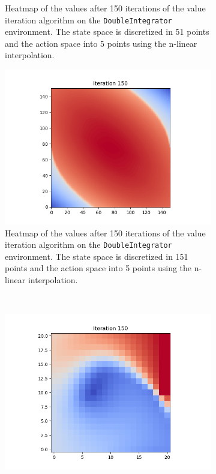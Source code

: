 \documentclass{article}
\begin{document}
\begin{enumerate}[(a)]
\begin{figure}[h!]
\begin{subfigure}{0.3\textwidth}
        \caption{Heatmap of the values after 150 iterations of the value iteration algorithm on the \texttt{DoubleIntegrator} environment. 
                The state space is discretized in 51 points and the action space into 5 points using the n-linear interpolation.}
    \end{subfigure}
    \hspace{0.1 in}
    \begin{subfigure}{0.3\textwidth}
        \centering
        \includegraphics[width=\textwidth]{figures/part_2_b_c.png}
        \caption{Heatmap of the values after 150 iterations of the value iteration algorithm on the \texttt{DoubleIntegrator} environment. 
                The state space is discretized in 151 points and the action space into 5 points using the n-linear interpolation.}
    \end{subfigure}
    \\
    \centering
    \begin{subfigure}{0.3\textwidth}
        \centering
        \includegraphics[width=\textwidth]{figures/part_2_b_mountain-car_s-21.png}

\end{subfigure}
\end{figure}
\end{enumerate}
\end{document}
